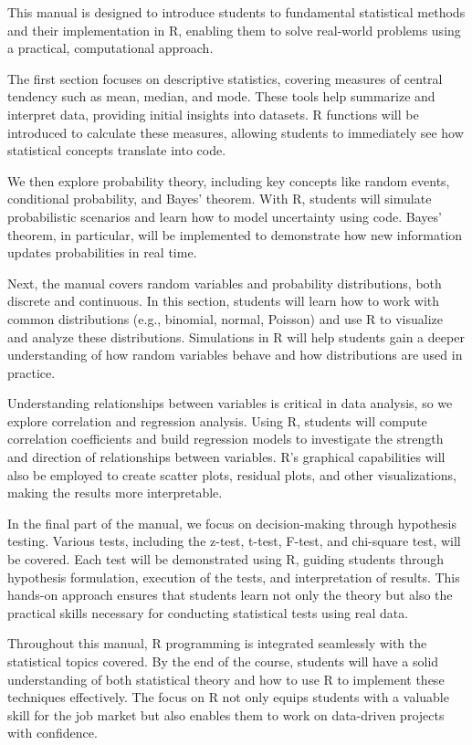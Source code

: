 \documentclass[10pt]{book}
\begin{document}
This manual is designed to introduce students to fundamental statistical methods and their implementation in R, enabling them to solve real-world problems using a practical, computational approach.

The first section focuses on descriptive statistics, covering measures of central tendency such as mean, median, and mode. These tools help summarize and interpret data, providing initial insights into datasets. R functions will be introduced to calculate these measures, allowing students to immediately see how statistical concepts translate into code.

We then explore probability theory, including key concepts like random events, conditional probability, and Bayes’ theorem. With R, students will simulate probabilistic scenarios and learn how to model uncertainty using code. Bayes’ theorem, in particular, will be implemented to demonstrate how new information updates probabilities in real time.

Next, the manual covers random variables and probability distributions, both discrete and continuous. In this section, students will learn how to work with common distributions (e.g., binomial, normal, Poisson) and use R to visualize and analyze these distributions. Simulations in R will help students gain a deeper understanding of how random variables behave and how distributions are used in practice.

Understanding relationships between variables is critical in data analysis, so we explore correlation and regression analysis. Using R, students will compute correlation coefficients and build regression models to investigate the strength and direction of relationships between variables. R’s graphical capabilities will also be employed to create scatter plots, residual plots, and other visualizations, making the results more interpretable.

In the final part of the manual, we focus on decision-making through hypothesis testing. Various tests, including the z-test, t-test, F-test, and chi-square test, will be covered. Each test will be demonstrated using R, guiding students through hypothesis formulation, execution of the tests, and interpretation of results. This hands-on approach ensures that students learn not only the theory but also the practical skills necessary for conducting statistical tests using real data.

Throughout this manual, R programming is integrated seamlessly with the statistical topics covered. By the end of the course, students will have a solid understanding of both statistical theory and how to use R to implement these techniques effectively. The focus on R not only equips students with a valuable skill for the job market but also enables them to work on data-driven projects with confidence.
\end{document}
